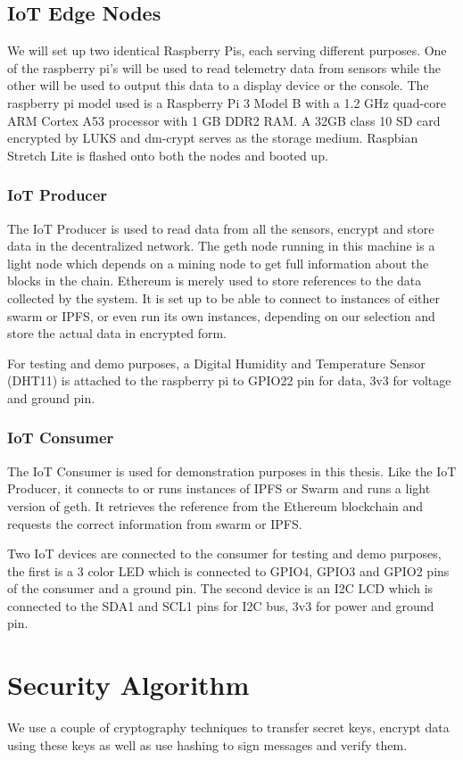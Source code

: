 \documentclass[11pt,openright]{report}
\begin{document}
\subsection{IoT Edge Nodes}
We will set up two identical Raspberry Pis, each serving different purposes. One of the raspberry pi's will be used to read telemetry data from sensors while the other will be used to output this data to a display device or the console.
The raspberry pi model used is a Raspberry Pi 3 Model B with a 1.2 GHz quad-core ARM Cortex A53 processor with 1 GB DDR2 RAM. A 32GB class 10 SD card encrypted by LUKS and dm-crypt serves as the storage medium. Raspbian Stretch Lite is flashed onto both the nodes and booted up.

\subsubsection{IoT Producer}
The IoT Producer is used to read data from all the sensors, encrypt and store data in the decentralized network. The geth node running in this machine is a light node which depends on a mining node to get full information about the blocks in the chain. Ethereum is merely used to store references to the data collected by the system. It is set up to be able to connect to instances of either swarm or IPFS, or even run its own instances, depending on our selection and store the actual data in encrypted form.

For testing and demo purposes, a Digital Humidity and Temperature Sensor (DHT11) is attached to the raspberry pi to GPIO22 pin for data, 3v3 for voltage and ground pin.

\subsubsection{IoT Consumer}
The IoT Consumer is used for demonstration purposes in this thesis. Like the IoT Producer, it connects to or runs instances of IPFS or Swarm and runs a light version of geth. It retrieves the reference from the Ethereum blockchain and requests the correct information from swarm or IPFS.

Two IoT devices are connected to the consumer for testing and demo purposes, the first is a 3 color LED which is connected to GPIO4, GPIO3 and GPIO2 pins of the consumer and a ground pin. The second device is an I2C LCD which is connected to the SDA1 and SCL1 pins for I2C bus, 3v3 for power and ground pin.

\section{Security Algorithm}
We use a couple of cryptography techniques to transfer secret keys, encrypt data using these keys as well as use hashing to sign messages and verify them.
\end{document}
